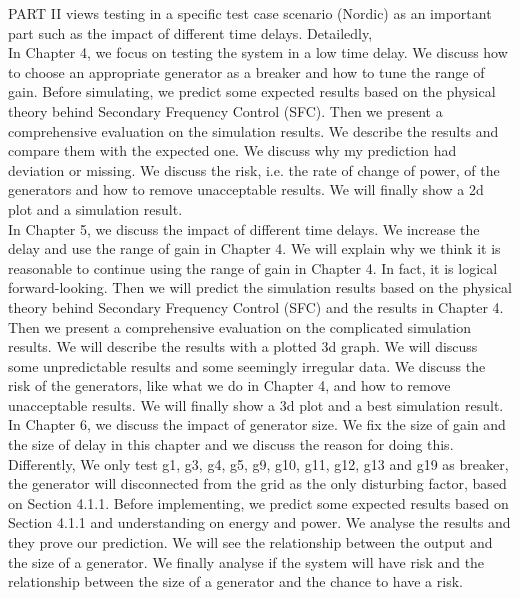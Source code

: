 \documentclass{report}
\begin{document}
PART II views testing in a specific test case scenario (Nordic) as an important part such as the impact of different time delays. Detailedly,\\

In Chapter 4, we focus on testing the system in a low time delay. We discuss how to choose an appropriate generator as a breaker and how to tune the range of  gain. Before simulating, we predict some expected results based on the physical theory behind Secondary Frequency Control (SFC). Then we present a comprehensive evaluation on the simulation results. We describe the results and compare them with the expected one. We discuss why my prediction had deviation or missing. We discuss the risk, i.e. the rate of change of power, of the generators and how to remove unacceptable results. We will finally show a 2d plot and a simulation result.\\

In Chapter 5, we discuss the impact of different time delays. We increase the delay and use the range of gain in Chapter 4. We will explain why we think it is reasonable to continue using the range of gain in Chapter 4. In fact, it is logical forward-looking. Then we will predict the simulation results based on the physical theory behind Secondary Frequency Control (SFC) and the results in Chapter 4. Then we present a comprehensive evaluation on the complicated simulation results. We will describe the results with a plotted 3d graph. We will discuss some unpredictable results and some seemingly irregular data. We discuss the risk of the generators, like what we do in Chapter 4, and how to remove unacceptable results. We will finally show a 3d plot and a best simulation result.\\

In Chapter 6, we discuss the impact of generator size. We fix the size of gain and the size of  delay in this chapter and we discuss the reason for doing this. Differently, We only test g1, g3, g4, g5, g9, g10, g11, g12, g13 and g19 as breaker, the generator will disconnected from the grid as the only disturbing factor, based on Section 4.1.1. Before implementing, we predict some expected results based on Section 4.1.1 and understanding on energy and power. We analyse the results and they prove our prediction. We will see the relationship between the output and the size of a generator. We finally analyse if the system will have risk and the relationship between the size of a generator and the chance to have a risk. \\
\end{document}
